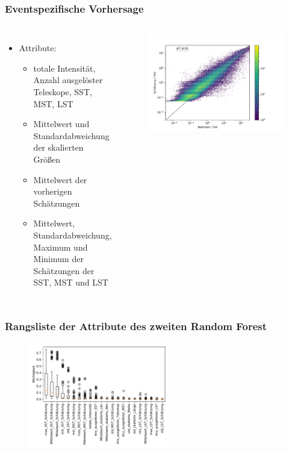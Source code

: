 \documentclass[aspectratio=1610, professionalfonts, 9pt]{beamer}
\begin{document}
  \begin{frame}
    \frametitle{Eventspezifische Vorhersage}
    \begin{columns}
      \begin{itemize}
        \item Attribute:
        \begin{itemize}
          \item totale Intensität, Anzahl ausgelöster Teleskope, SST, MST, LST
          \item Mittelwert und Standardabweichung der skalierten Größen
          \item Mittelwert der vorherigen Schätzungen
          \item Mittelwert, Standardabweichung, Maximum und Minimum der Schätzungen der SST, MST und LST
        \end{itemize}
      \end{itemize}
      \begin{figure}
        \includegraphics[width=1.1\textwidth]{pictures/RF_encaps.pdf}
        \caption{}
        \label{}
      \end{figure}
    \end{columns}
  \end{frame}

  \begin{frame}
    \frametitle{Rangsliste der Attribute des zweiten Random Forest}
    \begin{figure}
      \includegraphics[width=0.55\textwidth]{pictures/feautureimportance_boxplot_secondForest.pdf}
      \caption{}
      \label{}
    \end{figure}
  \end{frame}
\end{document}
